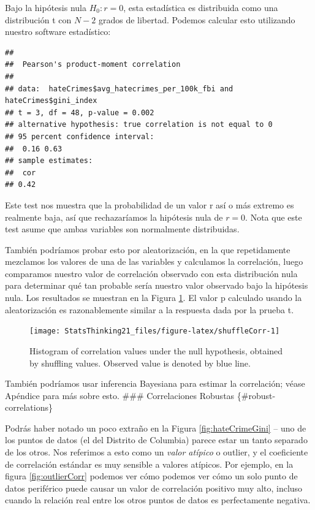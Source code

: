 \documentclass[
  12pt,
]{book}
\theoremstyle{definition}
\theoremstyle{definition}
\theoremstyle{definition}
\theoremstyle{remark}
\begin{document}
Bajo la hipótesis nula \(H_0:r=0\), esta estadística es distribuida como una distribución t con \(N - 2\) grados de libertad. Podemos calcular esto utilizando nuestro software estadístico:

\begin{verbatim}
## 
## 	Pearson's product-moment correlation
## 
## data:  hateCrimes$avg_hatecrimes_per_100k_fbi and hateCrimes$gini_index
## t = 3, df = 48, p-value = 0.002
## alternative hypothesis: true correlation is not equal to 0
## 95 percent confidence interval:
##  0.16 0.63
## sample estimates:
##  cor 
## 0.42
\end{verbatim}

Este test nos muestra que la probabilidad de un valor r así o más extremo es realmente baja, así que rechazaríamos la hipótesis nula de \(r=0\). Nota que este test asume que ambas variables son normalmente distribuidas.

También podríamos probar esto por aleatorización, en la que repetidamente mezclamos los valores de una de las variables y calculamos la correlación, luego comparamos nuestro valor de correlación observado con esta distribución nula para determinar qué tan probable sería nuestro valor observado bajo la hipótesis nula. Los resultados se muestran en la Figura \ref{fig:shuffleCorr}. El valor p calculado usando la aleatorización es razonablemente similar a la respuesta dada por la prueba t.

\begin{figure}
\texttt{[image: StatsThinking21\_files/figure-latex/shuffleCorr-1]} \caption{Histogram of correlation values under the null hypothesis, obtained by shuffling values. Observed value is denoted by blue line.}\label{fig:shuffleCorr}
\end{figure}

También podríamos usar inferencia Bayesiana para estimar la correlación; véase Apéndice para más sobre esto.
\#\#\# Correlaciones Robustas \{\#robust-correlations\}

Podrás haber notado un poco extraño en la Figura \ref{fig:hateCrimeGini} -- uno de los puntos de datos (el del Distrito de Columbia) parece estar un tanto separado de los otros. Nos referimos a esto como un \emph{valor atípico} o outlier, y el coeficiente de correlación estándar es muy sensible a valores atípicos. Por ejemplo, en la figura \ref{fig:outlierCorr} podemos ver cómo podemos ver cómo un solo punto de datos periférico puede causar un valor de correlación positivo muy alto, incluso cuando la relación real entre los otros puntos de datos es perfectamente negativa.
\end{document}
